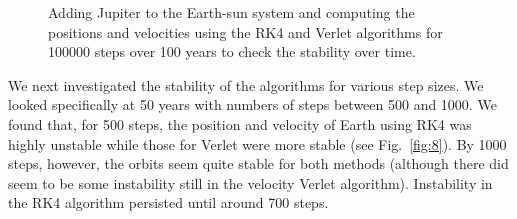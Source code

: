 \documentclass[12pt]{article}
\numberwithin{equation}{section}
\begin{document}
\begin{figure}[h]
\begin{center}
\begin{subfigure}
\end{subfigure} 
\caption{Adding Jupiter to the Earth-sun system and computing the positions and velocities using the RK4 and Verlet algorithms for 100000 steps over 100 years to check the stability over time.}
\label{fig:7}
\end{center}
\end{figure}

\par We next investigated the stability of the algorithms for various step sizes.  We looked specifically at 50 years with numbers of steps between 500 and 1000.  We found that, for 500 steps, the position and velocity of Earth using RK4 was highly unstable while those for Verlet were more stable (see Fig.~\ref{fig:8}).  By 1000 steps, however, the orbits seem quite stable for both methods (although there did seem to be some instability still in the velocity Verlet algorithm).  Instability in the RK4 algorithm persisted until around 700 steps.
\end{document}

